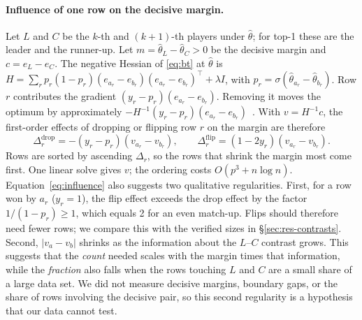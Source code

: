 \documentclass{article}
\begin{document}
\paragraph{Influence of one row on the decisive margin.}
Let $L$ and $C$ be the $k$-th and $(k{+}1)$-th players under $\hat\theta$; for top-1 these are the leader and the runner-up. Let $m=\hat\theta_L-\hat\theta_C>0$ be the decisive margin and $c=e_L-e_C$. The negative Hessian of \eqref{eq:bt} at $\hat\theta$ is $H=\sum_r p_r(1-p_r)(e_{a_r}-e_{b_r})(e_{a_r}-e_{b_r})^\top+\lambda I$, with $p_r=\sigma(\hat\theta_{a_r}-\hat\theta_{b_r})$. Row $r$ contributes the gradient $(y_r-p_r)(e_{a_r}-e_{b_r})$. Removing it moves the optimum by approximately $-H^{-1}(y_r-p_r)(e_{a_r}-e_{b_r})$~\citep{Cook2000DetectionOI,Koh2017UnderstandingBP}. With $v=H^{-1}c$, the first-order effects of dropping or flipping row $r$ on the margin are therefore
\begin{equation}
\Delta^{\text{drop}}_r=-(y_r-p_r)(v_{a_r}-v_{b_r}),\qquad
\Delta^{\text{flip}}_r=(1-2y_r)(v_{a_r}-v_{b_r}).
\label{eq:influence}
\end{equation}
Rows are sorted by ascending $\Delta_r$, so the rows that shrink the margin most come first. One linear solve gives $v$; the ordering costs $O(p^3+n\log n)$. Equation~\eqref{eq:influence} also suggests two qualitative regularities. First, for a row won by $a_r$ ($y_r=1$), the flip effect exceeds the drop effect by the factor $1/(1-p_r)\ge 1$, which equals 2 for an even match-up. Flips should therefore need fewer rows; we compare this with the verified sizes in \S\ref{sec:res-contrasts}. Second, $|v_{a}-v_{b}|$ shrinks as the information about the $L$--$C$ contrast grows. This suggests that the \emph{count} needed scales with the margin times that information, while the \emph{fraction} also falls when the rows touching $L$ and $C$ are a small share of a large data set. We did not measure decisive margins, boundary gaps, or the share of rows involving the decisive pair, so this second regularity is a hypothesis that our data cannot test.
\end{document}
